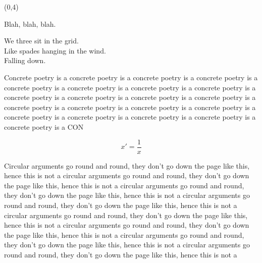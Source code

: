 \documentclass[a0,portrait]{a0poster}
\def\LHead#1{\noindent{\LARGE\color{DarkBlue} #1}\smallskip}
\begin{document}
\begin{textblock}{7}(0,4)
  \LHead{Introduction}
  
  Blah, blah, blah.

  We three sit in the grid.\\
  Like spades hanging in the wind.\\
  Falling down.

  Concrete poetry is a concrete poetry is a concrete poetry is a 
  concrete poetry is a concrete poetry is a concrete poetry is a 
  concrete poetry is a concrete poetry is a concrete poetry is a 
  concrete poetry is a concrete poetry is a concrete poetry is a 
  concrete poetry is a concrete poetry is a concrete poetry is a 
  concrete poetry is a concrete poetry is a concrete poetry is a 
  concrete poetry is a concrete poetry is a concrete poetry is a 
  CON

  \[
  x' = \frac{1}{x}
  \]

  Circular arguments go round and round, they don't go down the page
  like this, hence this is not a circular arguments go round and round, they don't go down the page
  like this, hence this is not a circular arguments go round and round, they don't go down the page
  like this, hence this is not a circular arguments go round and round, they don't go down the page
  like this, hence this is not a circular arguments go round and round, they don't go down the page
  like this, hence this is not a circular arguments go round and round, they don't go down the page
  like this, hence this is not a circular arguments go round and round, they don't go down the page
  like this, hence this is not a circular arguments go round and round, they don't go down the page
  like this, hence this is not a 

\end{textblock}
\end{document}
